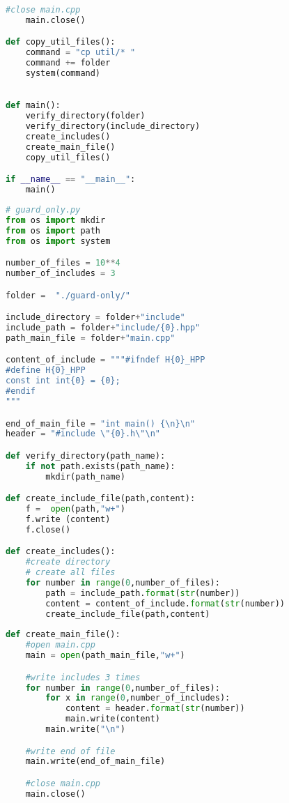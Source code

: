 \begin{apendicesenv}
\begin{lstlisting}[language=Python,caption={
            Script Guardas de Inclusão Externa },
                   label=script_external_include]
    #close main.cpp
    main.close()

def copy_util_files():
    command = "cp util/* "
    command += folder
    system(command)
    

def main():
    verify_directory(folder)
    verify_directory(include_directory)
    create_includes()
    create_main_file()
    copy_util_files()

if __name__ == "__main__":
    main()
\end{lstlisting}

\begin{lstlisting}[language=Python,caption={
              Script Guardas de Inclusão Interna},
                     label=script_intenal_include]
# guard_only.py
from os import mkdir
from os import path
from os import system

number_of_files = 10**4
number_of_includes = 3

folder =  "./guard-only/"

include_directory = folder+"include"
include_path = folder+"include/{0}.hpp"
path_main_file = folder+"main.cpp"

content_of_include = """#ifndef H{0}_HPP
#define H{0}_HPP
const int int{0} = {0};
#endif
"""

end_of_main_file = "int main() {\n}\n"
header = "#include \"{0}.h\"\n"

def verify_directory(path_name):
    if not path.exists(path_name):
        mkdir(path_name)

def create_include_file(path,content):
    f =  open(path,"w+")
    f.write (content)
    f.close()

def create_includes():
    #create directory
    # create all files
    for number in range(0,number_of_files):
        path = include_path.format(str(number))
        content = content_of_include.format(str(number))
        create_include_file(path,content)
    
def create_main_file():
    #open main.cpp
    main = open(path_main_file,"w+")

    #write includes 3 times
    for number in range(0,number_of_files):
        for x in range(0,number_of_includes):
            content = header.format(str(number))
            main.write(content)
        main.write("\n")

    #write end of file
    main.write(end_of_main_file)

    #close main.cpp
    main.close()
                                                                                  

\end{lstlisting}
\end{apendicesenv}

